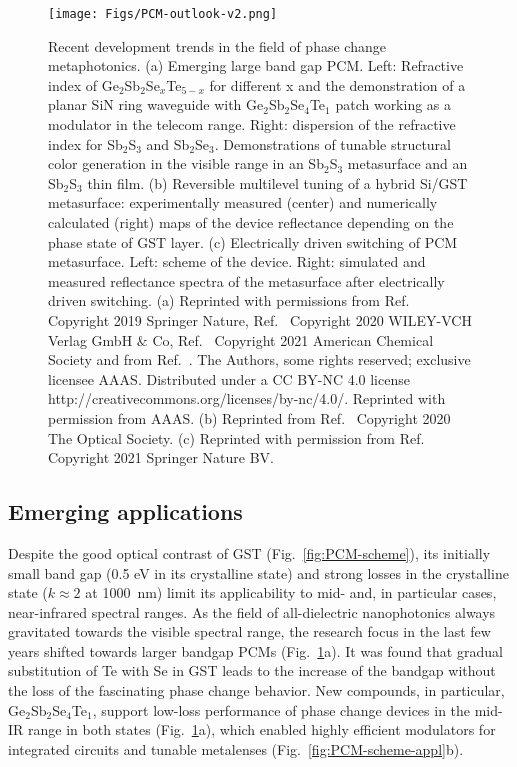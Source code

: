 \documentclass[journal=chreay,manuscript=review]{achemso}
\begin{document}
\begin{figure}
    \centering
    \texttt{[image: Figs/PCM-outlook-v2.png]}
    \caption{
    Recent development trends in the field of phase change metaphotonics. (a) Emerging large band gap PCM. Left: Refractive index of Ge$_2$Sb$_2$Se$_x$Te$_{5-x}$ for different x and the demonstration of a planar SiN ring waveguide with Ge$_2$Sb$_2$Se$_4$Te$_1$ patch working as a modulator in the telecom range. Right: dispersion of the refractive index for Sb$_2$S$_3$ and Sb$_2$Se$_3$. Demonstrations of tunable structural color generation in the visible range in an Sb$_2$S$_3$ metasurface and an Sb$_2$S$_3$ thin film.  (b) Reversible multilevel tuning of a hybrid Si/GST metasurface: experimentally measured (center) and numerically calculated (right) maps of the device reflectance depending on the phase state of GST layer. (c) Electrically driven switching of PCM metasurface. Left: scheme of the device. Right: simulated and measured reflectance spectra of the metasurface after electrically driven switching. (a) Reprinted with permissions from Ref.~ Copyright 2019 Springer Nature, Ref.~ Copyright 2020 WILEY-VCH Verlag GmbH $\&$ Co, Ref.~ Copyright 2021 American Chemical Society and from Ref.~. \textcopyright  The Authors, some rights reserved; exclusive licensee AAAS. Distributed under a CC BY-NC 4.0 license http://creativecommons.org/licenses/by-nc/4.0/.  Reprinted with permission from AAAS. (b) Reprinted from Ref.~ Copyright 2020 The Optical Society. (c) Reprinted with permission from Ref.~ Copyright 2021 Springer Nature BV. }
    \label{fig:PCM-outlook}
\end{figure}

\subsection{Emerging applications}

Despite the good optical contrast of GST (Fig.~\ref{fig:PCM-scheme}), its initially small band gap (0.5 eV in its crystalline state) and strong losses in the crystalline state ($k\approx2$ at 1000~nm) limit its applicability to mid- and, in particular cases, near-infrared spectral ranges. As the field of all-dielectric nanophotonics always gravitated towards the visible spectral range, the research focus in the last few years shifted towards larger bandgap PCMs (Fig.~\ref{fig:PCM-outlook}a). It was found that gradual substitution of Te with Se in GST leads to the increase of the bandgap without the loss of the fascinating phase change behavior. New compounds, in particular, Ge$_2$Sb$_2$Se$_4$Te$_1$, support low-loss performance of phase change devices in the mid-IR range in both states (Fig.~\ref{fig:PCM-outlook}a), which enabled highly efficient modulators for integrated circuits \cite{zhang2019broadband}  and tunable metalenses\cite{shalaginov2021reconfigurable} (Fig.~\ref{fig:PCM-scheme-appl}b).
\end{document}
